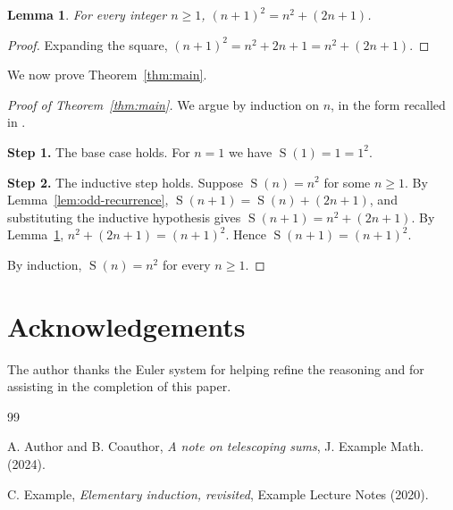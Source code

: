 \documentclass{amsart}
\theoremstyle{plain}
\newtheorem{lem}[thm]{Lemma}
\theoremstyle{definition}
\theoremstyle{remark}
\DeclareMathOperator{\Oddsum}{S}
\begin{document}
\begin{lem}\label{lem:square-recurrence}
For every integer $n \ge 1$, $(n+1)^2 = n^2 + (2n+1)$.
\end{lem}

\begin{proof}
Expanding the square, $(n+1)^2 = n^2 + 2n + 1 = n^2 + (2n+1)$.
\end{proof}

We now prove Theorem~\ref{thm:main}.

\begin{proof}[Proof of Theorem~\ref{thm:main}]
We argue by induction on $n$, in the form recalled in \cite[Section~1]{Exm20}.

\noindent\textbf{Step 1.} The base case holds. For $n = 1$ we have $\Oddsum(1) = 1 = 1^2$.

\noindent\textbf{Step 2.} The inductive step holds. Suppose $\Oddsum(n) = n^2$ for some $n \ge 1$. By Lemma~\ref{lem:odd-recurrence}, $\Oddsum(n+1) = \Oddsum(n) + (2n+1)$, and substituting the inductive hypothesis gives $\Oddsum(n+1) = n^2 + (2n+1)$. By Lemma~\ref{lem:square-recurrence}, $n^2 + (2n+1) = (n+1)^2$. Hence $\Oddsum(n+1) = (n+1)^2$.

By induction, $\Oddsum(n) = n^2$ for every $n \ge 1$.
\end{proof}

\section*{Acknowledgements}
The author thanks the Euler system for helping refine the reasoning and for assisting in the completion of this paper.

\begin{thebibliography}{99}

A. Author and B. Coauthor,
\emph{A note on telescoping sums},
J. Example Math. (2024).

C. Example,
\emph{Elementary induction, revisited},
Example Lecture Notes (2020).

\end{thebibliography}
\end{document}
